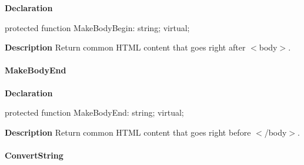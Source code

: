\documentclass{report}
\newif\ifpdf
\begin{document}
\label{PasDoc_GenHtml.TGenericHTMLDocGenerator-MakeBodyBegin}
\begin{list}{}{
\setlength{\itemindent}{0cm}
\setlength{\listparindent}{0cm}
\setlength{\leftmargin}{\evensidemargin}
\addtolength{\leftmargin}{\tmplength}
\settowidth{\labelsep}{X}
\addtolength{\leftmargin}{\labelsep}
\setlength{\labelwidth}{\tmplength}
}
\item[\textbf{Declaration}\hfill]
\ifpdf
\begin{flushleft}
\fi
\begin{ttfamily}
protected function MakeBodyBegin: string; virtual;\end{ttfamily}

\ifpdf
\end{flushleft}
\fi

\par
\item[\textbf{Description}]
Return common HTML content that goes right after {$<$}body{$>$}.

\end{list}
\paragraph*{MakeBodyEnd}\hspace*{\fill}

\label{PasDoc_GenHtml.TGenericHTMLDocGenerator-MakeBodyEnd}
\begin{list}{}{
\setlength{\itemindent}{0cm}
\setlength{\listparindent}{0cm}
\setlength{\leftmargin}{\evensidemargin}
\addtolength{\leftmargin}{\tmplength}
\settowidth{\labelsep}{X}
\addtolength{\leftmargin}{\labelsep}
\setlength{\labelwidth}{\tmplength}
}
\item[\textbf{Declaration}\hfill]
\ifpdf
\begin{flushleft}
\fi
\begin{ttfamily}
protected function MakeBodyEnd: string; virtual;\end{ttfamily}

\ifpdf
\end{flushleft}
\fi

\par
\item[\textbf{Description}]
Return common HTML content that goes right before {$<$}/body{$>$}.

\end{list}
\paragraph*{ConvertString}\hspace*{\fill}
\end{document}

